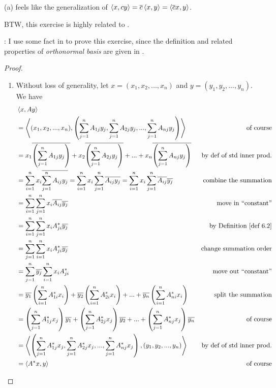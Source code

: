 \begin{note}
(a) feels like the generalization of \(\left< x, cy \right> = \overline{c} \left< x, y \right> = \left< \overline{c}x, y \right>\).

BTW, this exercise is highly related to .

: I use some fact in  to prove this exercise, since the definition and related properties of \emph{orthonormal basis} are given in .
\end{note}

\begin{proof} \ 

\begin{enumerate}
\item Without loss of generality, let \(x = (x_1, x_2, ..., x_n)\) and \(y = (y_1, y_2, ..., y_n)\).
We have
\begin{align*}
    & \LG x, Ay \RG \\
    & = \LG (x_1, x_2, ..., x_n), \left( \sum_{j = 1}^n A_{1j} y_j, \sum_{j = 1}^n A_{2j} y_j, ..., \sum_{j = 1}^n A_{nj} y_j \right) \RG & \text{of course} \\
    & = x_1 \conjugatet{\left( \sum_{j = 1}^n A_{1j} y_j \right)}
      + x_2 \conjugatet{\left( \sum_{j = 1}^n A_{2j} y_j \right)}
      + ...
      + x_n \conjugatet{\left( \sum_{j = 1}^n A_{nj} y_j \right)} & \text{by def of std inner prod.} \\
    & = \sum_{i = 1}^n x_i \conjugatet{\sum_{j = 1}^n A_{ij} y_j}
      = \sum_{i = 1}^n x_i \sum_{j = 1}^n \conjugatet{A_{ij} y_j}
      = \sum_{i = 1}^n x_i \sum_{j = 1}^n \conjugatet{A_{ij}} \conjugatet{y_j} & \text{combine the summation} \\
    & = \sum_{i = 1}^n \sum_{j = 1}^n x_i \conjugatet{A_{ij}} \conjugatet{y_j} & \text{move in ``constant''} \\
    & = \sum_{i = 1}^n \sum_{j = 1}^n x_i A^*_{ji} \conjugatet{y_j} & \text{by \DEF{6.2}} \\
    & = \sum_{j = 1}^n \sum_{i = 1}^n x_i A^*_{ji} \conjugatet{y_j} & \text{change summation order} \\
    & = \sum_{j = 1}^n \conjugatet{y_j} \sum_{i = 1}^n x_i A^*_{ji} & \text{move out ``constant''} \\
    & = \conjugatet{y_1} \left( \sum_{i = 1}^n A^*_{1i} x_i \right)
      + \conjugatet{y_2} \left( \sum_{i = 1}^n A^*_{2i} x_i \right)
      + ...
      + \conjugatet{y_n} \left( \sum_{i = 1}^n A^*_{ni} x_i \right) & \text{split the summation} \\
    & = \left( \sum_{j = 1}^n A^*_{1j} x_j \right) \conjugatet{y_1}
      + \left( \sum_{j = 1}^n A^*_{2j} x_j \right) \conjugatet{y_2}
      + ...
      + \left( \sum_{j = 1}^n A^*_{nj} x_j \right) \conjugatet{y_n} & \text{of course} \\
    & = \LG \left( \sum_{j = 1}^n A^*_{1j} x_j, \sum_{j = 1}^n A^*_{2j} x_j, ..., \sum_{j = 1}^n A^*_{nj} x_j \right), (y_1, y_2, ..., y_n) \RG & \text{by def of std inner prod.} \\
    & = \LG A^* x, y \RG & \text{of course}
\end{align*}


\end{enumerate}
\end{proof}
